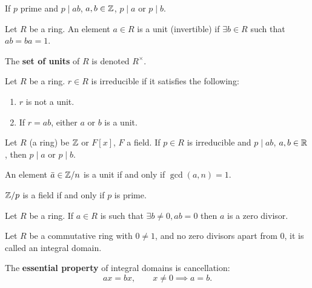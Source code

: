 \documentclass[10pt, a4paper]{article}
\begin{document}
\begin{lemma}
    If $p$ prime and $p \mid ab$,
    $a, b \in \mathbb{Z}$,
    $p \mid a$ or $p \mid b$.
\end{lemma}

\begin{definition}
    Let $R$ be a ring.
    An element $a \in R$ is a unit
    (invertible)
    if $\exists b \in R$ such that $ab = ba = 1$.
\end{definition}

The \textbf{set of units} of $R$ is denoted $R ^ {\times}$.

\begin{definition}
    Let $R$ be a ring.
    $r \in R$ is irreducible if it satisfies the following:
    \begin{enumerate}[label = (\roman*)]
        \item $r$ is not a unit.

        \item If $r = ab$,
        either $a$ or $b$ is a unit.
    \end{enumerate}
\end{definition}

\begin{lemma}
    Let $R$
    (a ring)
    be $\mathbb{Z}$ or $F[x]$,
    $F$ a field.
    If $p \in R$ is irreducible and $p \mid ab$,
    $a, b \in \mathbb{R}$,
    then $p \mid a$ or $p \mid b$.
\end{lemma}

\begin{proposition}
    An element $\bar{a} \in \mathbb{Z} / n$ is a unit if and only if $\gcd(a, n) = 1$.
\end{proposition}

\begin{corollary}
    $\mathbb{Z} / p$ is a field if and only if $p$ is prime.
\end{corollary}

\begin{definition}
    Let $R$ be a ring.
    If $a \in R$ is such that $\exists b \neq 0, ab = 0$ then $a$ is a zero divisor.
\end{definition}

\begin{definition}
    Let $R$ be a commutative ring with $0 \neq 1$,
    and no zero divisors apart from $0$,
    it is called an integral domain.
\end{definition}

The \textbf{essential property} of integral domains is cancellation:
\[
ax = bx,\qquad x \neq 0 \implies a = b.
\]
\end{document}
